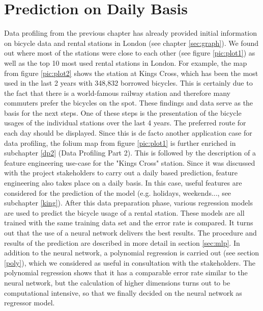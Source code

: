 \section{Prediction on Daily Basis}\label{sec:daily}
Data profiling from the previous chapter has already provided initial information on bicycle data and rental stations in London (see chapter \ref{sec:graph}). We found out where most of the stations were close to each other (see figure \ref{pic:plot1}) as well as the top 10 most used rental stations in London. For example, the map from figure \ref{pic:plot2} shows the station at Kings Cross, which has been the most used in the last 2 years with 348,832 borrowed bicycles. This is certainly due to the fact that there is a world-famous railway station and therefore many commuters prefer the bicycles on the spot. These findings and data serve as the basis for the next steps.
One of these steps is the presentation of the bicycle usages of the individual stations over the last 4 years. The preferred route for each day should be displayed. Since this is de facto another application case for data profiling, the folium map from figure \ref{pic:plot1} is further enriched in subchapter \ref{dp2} (Data Profiling Part 2).
This is followed by the description of a feature engineering use-case for the "Kings Cross" station. Since it was discussed with the project stakeholders to carry out a daily based prediction, feature engineering also takes place on a daily basis. In this case, useful features are considered for the prediction of the model (e.g. holidays, weekends..., see subchapter \ref{king}).
After this data preparation phase, various regression models are used to predict the bicycle usage of a rental station. These models are all trained with the same training data set and the error rate is compared. It turns out that the use of a neural network delivers the best results. The procedure and results of the prediction are described in more detail in section \ref{sec:mlp}.
In addition to the neural network, a polynomial regression is carried out (see section \ref{poly}), which we considered as useful in consultation with the stakeholders. The polynomial regression shows that it has a comparable error rate similar to the neural network, but the calculation of higher dimensions turns out to be computational intensive, so that we finally decided on the neural network as regressor model.


